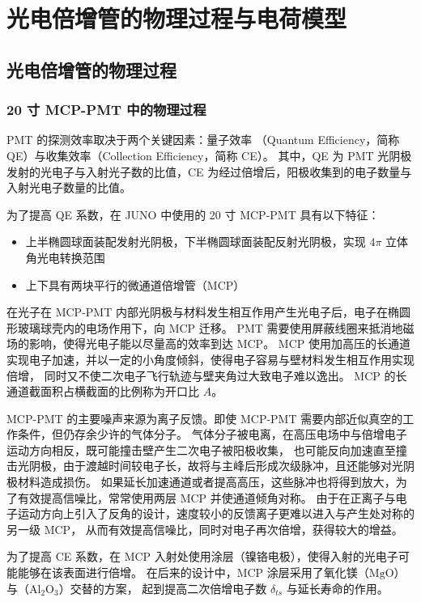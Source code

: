 
\chapter{光电倍增管的物理过程与电荷模型}

\section{光电倍增管的物理过程}

\subsection{20 寸 MCP-PMT 中的物理过程}\label{sec:mcp-pmt-process}
PMT 的探测效率取决于两个关键因素：量子效率 （Quantum Efficiency，简称 QE）与收集效率（Collection Efficiency，简称 CE）。
其中，QE 为 PMT 光阴极发射的光电子与入射光子数的比值，CE 为经过倍增后，阳极收集到的电子数量与入射光电子数量的比值。

为了提高 QE 系数，在 JUNO 中使用的 20 寸 MCP-PMT 具有以下特征\cite{wangNewDesignLarge2012}：
\begin{itemize}
    \item 上半椭圆球面装配发射光阴极，下半椭圆球面装配反射光阴极，实现 $4\pi$ 立体角光电转换范围
    \item 上下具有两块平行的微通道倍增管（MCP）
\end{itemize}

在光子在 MCP-PMT 内部光阴极与材料发生相互作用产生光电子后，电子在椭圆形玻璃球壳内的电场作用下，向 MCP 迁移。
PMT 需要使用屏蔽线圈来抵消地磁场的影响，使得光电子能以尽量高的效率到达 MCP。
MCP 使用加高压的长通道实现电子加速，并以一定的小角度倾斜，使得电子容易与壁材料发生相互作用实现倍增，
同时又不使二次电子飞行轨迹与壁夹角过大致电子难以逸出。
MCP 的长通道截面积占横截面的比例称为开口比 $A$。

MCP-PMT 的主要噪声来源为离子反馈。即使 MCP-PMT 需要内部近似真空的工作条件，但仍存余少许的气体分子。
气体分子被电离，在高压电场中与倍增电子运动方向相反，既可能撞击壁产生二次电子被阳极收集，
也可能反向加速直至撞击光阴极，由于渡越时间较电子长，故将与主峰后形成次级脉冲，且还能够对光阴极材料造成损伤。
如果延长加速通道或者提高高压，这些脉冲也将得到放大，为了有效提高信噪比，常常使用两层 MCP 并使通道倾角对称。
由于在正离子与电子运动方向上引入了反角的设计，速度较小的反馈离子更难以进入与产生处对称的另一级 MCP，
从而有效提高信噪比，同时对电子再次倍增，获得较大的增益\cite{MaterialStore2010}。

为了提高 CE 系数，在 MCP 入射处使用涂层（镍铬电极），使得入射的光电子可能能够在该表面进行倍增。
在后来的设计中，MCP 涂层采用了氧化镁（$\text{MgO}$）与（$\text{Al}_2\text{O}_3$）交替的方案，
起到提高二次倍增电子数 $\delta_{ts}$ 与延长寿命的作用。

